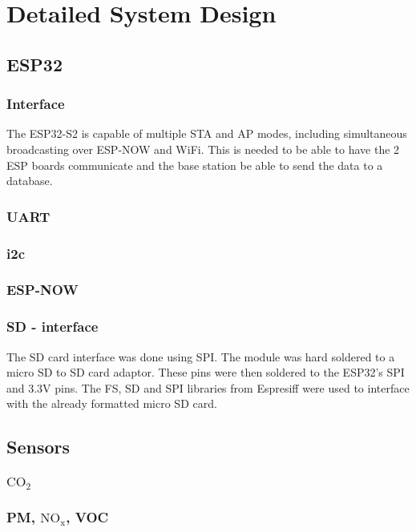 \chapter{Detailed System Design}
\section{ESP32}

\subsection{Interface}
The ESP32-S2 is capable of multiple STA and AP modes, including simultaneous broadcasting over ESP-NOW and WiFi. This is needed to be able to have the 2 ESP boards communicate and the base station be able to send the data to a database.


\subsection{UART}

\subsection{i2c}

\subsection{ESP-NOW}

\subsection{SD - interface}
The SD card interface was done using SPI. The module was hard soldered to a micro SD to SD card adaptor. These pins were then soldered to the ESP32's SPI and 3.3V pins.
The FS, SD and SPI libraries from Espresiff were used to interface with the already formatted micro SD card.




\section{Sensors}
\subsection{$\mathrm{CO_2}$}




\subsection{PM, $\mathrm{NO_x}$, VOC}
